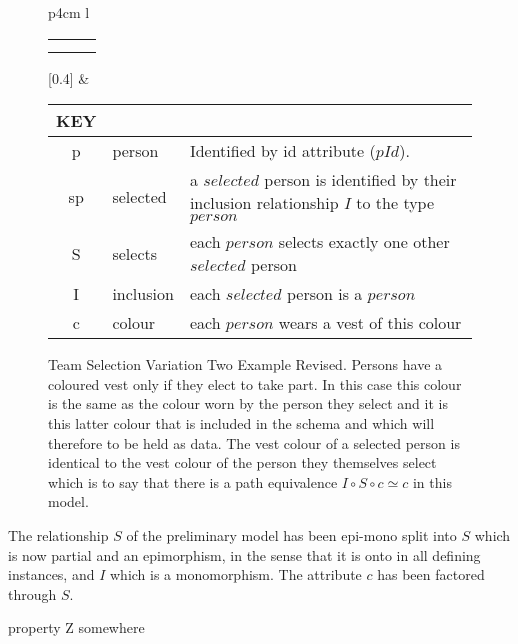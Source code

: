 \begin{figure} [h]
\begin{center}
\begin{tabular}{p{4cm}  l }
\begin{tabular}{c p{1.5cm} c}
   \Rnode{sp}{\rnode{sps}{s}\rnode{spp}{p}} & &    \\[1.4cm]
   \Rnode{p}{p}   & & \Rnode{v}{v}
\end{tabular}
\idcomp
{}
[0.4]
\idcomp &\footnotesize
\begin{tabular}{c p{1.5cm} p{4cm}}
KEY && \\
\hline
p & person & Identified by id attribute ($pId$). \\
sp & selected & a $selected$ person is identified by their inclusion relationship $I$ to the type $person$ \\
S & selects & each $person$ selects exactly one other $selected$ person \\
I & inclusion & each $selected$ person is a $person$ \\
c & colour & each $person$ wears a vest of this colour 
\end{tabular} 
\end{tabular}
\end{center}
\caption{Team Selection Variation Two Example Revised. 
Persons have a coloured vest only if they elect to take part.
In this case this colour is the same as the colour 
worn by the person they select and it is this latter colour that is included in the schema and which will therefore to be held as data. The  vest colour  of a selected person is 
identical to the vest colour of the person they themselves select which is to say that there is a  path equivalence $I \circ S \circ c \simeq c$ in this model.
}
\label{teamselectionvariationtworevisedERschema}
\end{figure}

\begin{categoricalaside}

The relationship $S$ of the preliminary model has been epi-mono split into $S$ which is now partial and an epimorphism, in the sense that it is onto in all defining instances,
and $I$ which is a monomorphism. The attribute $c$ has been factored through $S$.
\end{categoricalaside}

property Z somewhere

